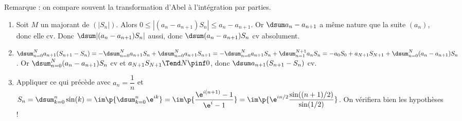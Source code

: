 Remarque : on compare souvent la transformation d'Abel à l'intégration par parties.
\begin{enumerate}
 \item Soit $M$ un majorant de $(|S_n|)$. Alors $0\leq |(a_n-a_{n+1})S_n|\leq a_n-a_{n+1}$. Or $\dsum a_n-a_{n+1}$ a même nature que la suite $(a_n)$, donc elle cv. Donc $\dsum |(a_n-a_{n+1})S_n|$ aussi, donc $\dsum (a_n-a_{n+1})S_n$ cv absolument.
 \item $\dsum_{n=0}^N a_{n+1}(S_{n+1}-S_n)=-\dsum_{n=0}^N a_{n+1}S_n+\dsum_{n=0}^N a_{n+1}S_{n+1}=-\dsum_{n=0}^N a_{n+1}S_n+\dsum_{n=1}^{N+1} a_{n}S_{n}=-a_0S_0+a_{N+1}S_{N+1}+\dsum_{n=0}^N (a_n-a_{n+1})S_n$. Or $\dsum_{n=0}^N (a_n-a_{n+1})S_n$ cv et $a_{N+1}S_{N+1}\Tend N{\pinf}0$, donc $\dsum a_{n+1}(S_{n+1}-S_n)$ cv.
 \item Appliquer ce qui précède avec $a_n=\dfrac 1n$ et $S_n=\dsum_{k=0}^{n} \sin(k)=\im\p{\dsum_{k=0}^{n} \e^{ik}}=\im\p{\dfrac{\e^{i(n+1)}-1}{\e^{i}-1}}=\im\p{\e^{in/2}\dfrac{\sin((n+1)/2)}{\sin(1/2)}}$. On vérifiera bien les hypothèses !
\end{enumerate}
